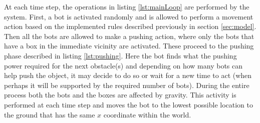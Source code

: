 At each time step, the operations in listing \ref{lst:mainLoop} are performed by the system. First, a bot is activated randomly and is allowed to perform a movement action based on the implemented rules described previously in section \ref{sec:model}. Then all the bots are allowed to make a pushing action, where only the bots that have a box in the immediate vicinity are activated. These proceed to the pushing phase described in listing \ref{lst:pushing}. Here the bot finds what the pushing power required for the next obstacle(s) and depending on how many bots can help push the object, it may decide to do so or wait for a new time to act (when perhaps it will be supported by the required number of bots). During the entire process both the bots and the boxes are affected by gravity. This activity is performed at each time step and moves the bot to the lowest possible location to the ground that has the same $x$ coordinate within the world.




